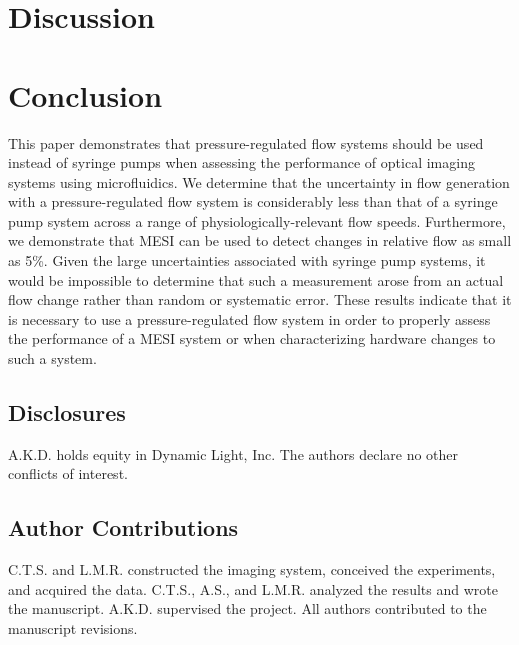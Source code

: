 \documentclass[12pt]{spieman}
\begin{document}
\begin{spacing}{2}
\section{Discussion}
\label{sect:discussion}

\blindtext


\section{Conclusion}
\label{sect:conclusion}

This paper demonstrates that pressure-regulated flow systems should be used instead of syringe pumps when assessing the performance of optical imaging systems using microfluidics. We determine that the uncertainty in flow generation with a pressure-regulated flow system is considerably less than that of a syringe pump system across a range of physiologically-relevant flow speeds. Furthermore, we demonstrate that MESI can be used to detect changes in relative flow as small as 5\%. Given the large uncertainties associated with syringe pump systems, it would be impossible to determine that such a measurement arose from an actual flow change rather than random or systematic error. These results indicate that it is necessary to use a pressure-regulated flow system in order to properly assess the performance of a MESI system or when characterizing hardware changes to such a system.


\subsection*{Disclosures}
A.K.D. holds equity in Dynamic Light, Inc. The authors declare no other conflicts of interest.

\subsection*{Author Contributions}
C.T.S. and L.M.R. constructed the imaging system, conceived the experiments, and acquired the data. C.T.S., A.S., and L.M.R. analyzed the results and wrote the manuscript. A.K.D. supervised the project. All authors contributed to the manuscript revisions.


\end{spacing}
\end{document}
